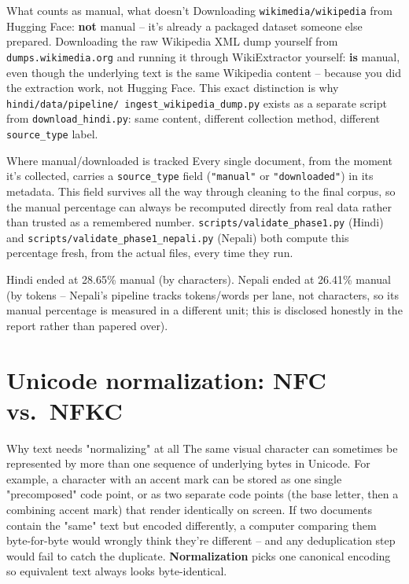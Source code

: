 \documentclass[11pt]{report}
\begin{document}
\begin{example}{What counts as manual, what doesn't}
Downloading \texttt{wikimedia/wikipedia} from Hugging Face: \textbf{not}
manual -- it's already a packaged dataset someone else prepared.
Downloading the raw Wikipedia XML dump yourself from
\texttt{dumps.wikimedia.org} and running it through WikiExtractor
yourself: \textbf{is} manual, even though the underlying text is the same
Wikipedia content -- because you did the extraction work, not Hugging
Face. This exact distinction is why \texttt{hindi/data/pipeline/
ingest\_wikipedia\_dump.py} exists as a separate script from
\texttt{download\_hindi.py}: same content, different collection method,
different \texttt{source\_type} label.
\end{example}

\begin{implementation}{Where manual/downloaded is tracked}
Every single document, from the moment it's collected, carries a
\texttt{source\_type} field (\texttt{"manual"} or \texttt{"downloaded"})
in its metadata. This field survives all the way through cleaning to the
final corpus, so the manual percentage can always be recomputed directly
from real data rather than trusted as a remembered number.
\texttt{scripts/validate\_phase1.py} (Hindi) and
\texttt{scripts/validate\_phase1\_nepali.py} (Nepali) both compute this
percentage fresh, from the actual files, every time they run.

Hindi ended at 28.65\% manual (by characters). Nepali ended at 26.41\%
manual (by tokens -- Nepali's pipeline tracks tokens/words per lane, not
characters, so its manual percentage is measured in a different unit;
this is disclosed honestly in the report rather than papered over).
\end{implementation}

\section{Unicode normalization: NFC vs.\ NFKC}

\begin{concept}{Why text needs "normalizing" at all}
The same visual character can sometimes be represented by more than one
sequence of underlying bytes in Unicode. For example, a character with an
accent mark can be stored as one single "precomposed" code point, or as
two separate code points (the base letter, then a combining accent mark)
that render identically on screen. If two documents contain the "same"
text but encoded differently, a computer comparing them byte-for-byte
would wrongly think they're different -- and any deduplication step would
fail to catch the duplicate. \textbf{Normalization} picks one canonical
encoding so equivalent text always looks byte-identical.
\end{concept}
\end{document}

